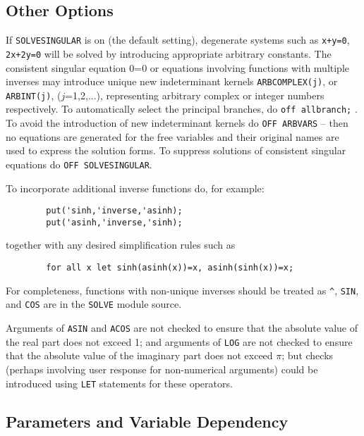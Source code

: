 \subsection{Other Options}
\hypertarget{switch:SOLVESINGULAR}{}
\hypertarget{switch:ALLBRANCH}{}
\hypertarget{switch:ARBVARS}{}
\hypertarget{operator:ARBCOMPLEX}{}
\hypertarget{operator:ARBINT}{}
If {\tt SOLVESINGULAR} is on (the default setting),
degenerate systems such as {\tt x+y=0}, {\tt 2x+2y=0} will be solved by
introducing appropriate arbitrary constants.
The consistent singular equation 0=0 or equations involving functions with
multiple inverses may introduce unique new indeterminant kernels
{\tt ARBCOMPLEX(j)}, or {\tt ARBINT(j)}, ($j$=1,2,...),  %
representing arbitrary complex or integer numbers respectively.  To
automatically select the principal branches, do {\tt off allbranch;} .
 To avoid the introduction of new indeterminant kernels
do {\tt OFF ARBVARS} -- then no equations are generated for the free
variables and their original names are used to express the solution forms.
To suppress solutions of consistent singular equations do
{\tt OFF SOLVESINGULAR}.

To incorporate additional inverse functions do, for example:
\begin{verbatim}
        put('sinh,'inverse,'asinh);
        put('asinh,'inverse,'sinh);
\end{verbatim}
together with any desired simplification rules such as
\begin{verbatim}
        for all x let sinh(asinh(x))=x, asinh(sinh(x))=x;
\end{verbatim}
For completeness, functions with non-unique inverses should be treated as
{\tt \verb|^|}, {\tt SIN}, and {\tt COS} are in the {\tt SOLVE}
 module source.

Arguments of {\tt ASIN} and {\tt ACOS} are not checked to ensure that the
absolute value of the real part does not exceed 1; and arguments of
{\tt LOG} are not checked to  ensure that the absolute value of the imaginary
part does not exceed $\pi$; but checks (perhaps involving user response
for non-numerical arguments) could be introduced using
{\tt LET} statements for these operators.

\subsection{Parameters and Variable Dependency}


